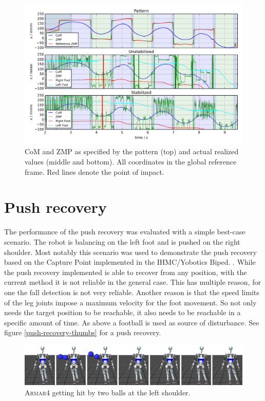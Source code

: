 \documentclass[english,ngerman]{KITreprt}
\newcommand{\name}[1]{\textsc{#1}}
\begin{document}
\begin{figure}[hbt]
\vspace*{-1em}
\includegraphics[width=\textwidth,resolution=300]{images/disturbed_straight_x.png}
\caption{CoM and ZMP as specified by the pattern (top) and actual realized values (middle and bottom).
All coordinates in the global reference frame. Red lines denote the point of impact.}
\label{img:disturbed-straight-x}
\end{figure}

\section{Push recovery}\label{push-recovery-1}

The performance of the push recovery was evaluated with a simple
best-case scenario. The robot is balancing on the left foot and is
pushed on the right shoulder. Most notably this scenario was used to
demonstrate the push recovery based on the Capture Point implemented in
the IHMC/Yobotics Biped. \cite{pratt2009video}. While the push recovery
implemented is able to recover from any position, with the current
method it is not reliable in the general case. This has multiple reason,
for one the fall detection is not very reliable. Another reason is that
the speed limits of the leg joints impose a maximum velocity for the
foot movement. So not only needs the target position to be reachable, it
also needs to be reachable in a specific amount of time. As above a
football is used as source of disturbance. See figure
\ref{push-recovery-thumbs} for a push recovery.

\begin{figure}[hbt]
\vspace*{-1em}
\includegraphics[width=\textwidth,resolution=300]{images/push_recovery_thumbs.png}
\caption{\name{Armar4} getting hit by two balls at the left shoulder.}
\label{img:push-recovery-thumbs}
\end{figure}
\end{document}
